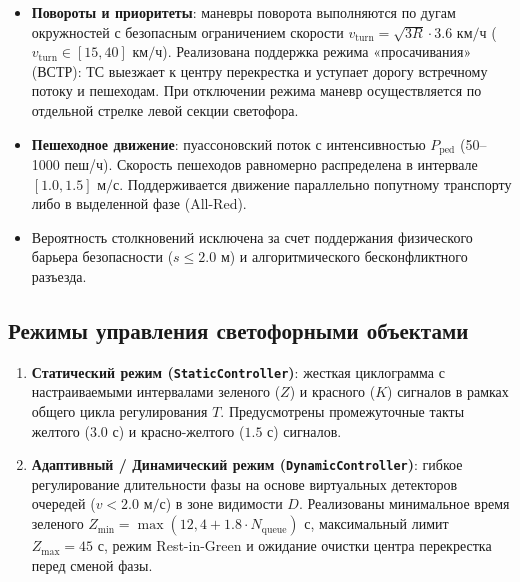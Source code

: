 \documentclass[11pt, a4paper]{article}
\begin{document}
\begin{itemize}
  \item \textbf{Повороты и приоритеты}: маневры поворота выполняются по дугам окружностей с безопасным ограничением скорости $v_{\text{turn}} = \sqrt{3 R} \cdot 3.6\text{ км/ч}$ ($v_{\text{turn}} \in [15, 40]\text{ км/ч}$). Реализована поддержка режима «просачивания» (ВСТР): ТС выезжает к центру перекрестка и уступает дорогу встречному потоку и пешеходам. При отключении режима маневр осуществляется по отдельной стрелке левой секции светофора.
  \item \textbf{Пешеходное движение}: пуассоновский поток с интенсивностью $P_{\text{ped}}$ (50--1000 пеш/ч). Скорость пешеходов равномерно распределена в интервале $[1.0, 1.5]\text{ м/с}$. Поддерживается движение параллельно попутному транспорту либо в выделенной фазе (All-Red).
  \item Вероятность столкновений исключена за счет поддержания физического барьера безопасности ($s \le 2.0\text{ м}$) и алгоритмического бесконфликтного разъезда.
\end{itemize}

\subsection{Режимы управления светофорными объектами}
\begin{enumerate}
  \item \textbf{Статический режим (\texttt{StaticController})}: жесткая циклограмма с настраиваемыми интервалами зеленого ($Z$) и красного ($K$) сигналов в рамках общего цикла регулирования $T$. Предусмотрены промежуточные такты желтого ($3.0\text{ с}$) и красно-желтого ($1.5\text{ с}$) сигналов.
  \item \textbf{Адаптивный / Динамический режим (\texttt{DynamicController})}: гибкое регулирование длительности фазы на основе виртуальных детекторов очередей ($v < 2.0\text{ м/с}$) в зоне видимости $D$. Реализованы минимальное время зеленого $Z_{\min} = \max(12, 4 + 1.8 \cdot N_{\text{queue}})\text{ с}$, максимальный лимит $Z_{\max} = 45\text{ с}$, режим Rest-in-Green и ожидание очистки центра перекрестка перед сменой фазы.
\end{enumerate}
\end{document}
